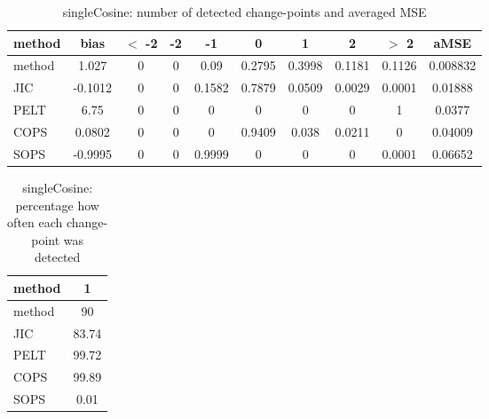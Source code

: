 \begin{table}[ht]
\centering
\begin{tabular}{l|c|ccccccc|c}
  \hline
method & bias & $<$ -2 & -2 & -1 & 0 & 1 & 2 & $>$ 2 & aMSE \\ 
  \hline
method & 1.027 &     0 &     0 &  0.09 & 0.2795 & 0.3998 & 0.1181 & 0.1126 & 0.008832 \\ 
  JIC & -0.1012 &     0 &     0 & 0.1582 & 0.7879 & 0.0509 & 0.0029 & 0.0001 & 0.01888 \\ 
  PELT &  6.75 &     0 &     0 &     0 &     0 &     0 &     0 &     1 & 0.0377 \\ 
  COPS & 0.0802 &     0 &     0 &     0 & 0.9409 & 0.038 & 0.0211 &     0 & 0.04009 \\ 
  SOPS & -0.9995 &     0 &     0 & 0.9999 &     0 &     0 &     0 & 0.0001 & 0.06652 \\ 
   \hline
\end{tabular}
\caption{singleCosine: number of detected change-points and averaged MSE} 
\label{tab:singleCosineNjumps}
\end{table}
\begin{table}[ht]
\centering
\begin{tabular}{l|c}
  \hline
method & 1 \\ 
  \hline
method &     90 \\ 
  JIC &  83.74 \\ 
  PELT &  99.72 \\ 
  COPS &  99.89 \\ 
  SOPS &   0.01 \\ 
   \hline
\end{tabular}
\caption{singleCosine: percentage how often each change-point was detected} 
\label{tab:singleCosineDetections}
\end{table}

